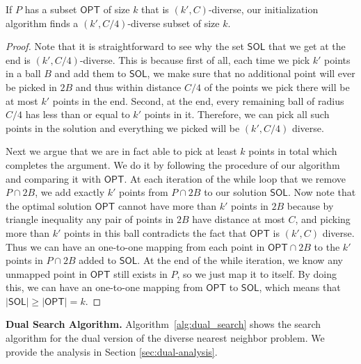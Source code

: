 \begin{lemma}[Initialization]\label{lm:initialization}
If $P$ has a subset $\mathsf{OPT}$ of size $k$ that is $(k',C)$-diverse, our initialization algorithm finds a $(k',C/4)$-diverse subset of size $k$.
\end{lemma}
\begin{proof}
    Note that it is straightforward to see why the set $\mathsf{SOL}$ that we get at the end is $(k',C/4)$-diverse. This is because first of all, each time we pick $k'$ points in a ball $B$ and add them to $\mathsf{SOL}$, we make sure that no additional point will ever be picked in $2B$ and thus within distance $C/4$ of the points we pick there will be at most $k'$ points in the end. Second, at the end, every remaining ball of radius $C/4$ has less than or equal to $k'$ points in it. Therefore, we can pick all such points in the solution and everything we picked will be $(k',C/4)$ diverse.


    Next we argue that we are in fact able to pick at least $k$ points in total which completes the argument. We do it by following the procedure of our algorithm and comparing it with $\mathsf{OPT}$. 
    At each iteration of the while loop that we remove $P\cap 2B$, we add exactly $k'$ points from $P\cap 2B$ to our solution $\mathsf{SOL}$. 
    Now note that the optimal solution $\mathsf{OPT}$ cannot have more than $k'$ points in $2B$ because by triangle inequality any pair of points in $2B$ have distance at most $C$, and picking more than $k'$ points in this ball contradicts the fact that $\mathsf{OPT}$ is $(k',C)$ diverse. Thus we can have an one-to-one mapping from each point in $\mathsf{OPT}\cap 2B$ to the $k'$ points in $P\cap 2B$ added to $\mathsf{SOL}$.
    At the end of the while iteration, we know any unmapped point in $\mathsf{OPT}$ still exists in $P$, so we just map it to itself. By doing this, we can have an one-to-one mapping from $\mathsf{OPT}$ to $\mathsf{SOL}$, which means that $|\mathsf{SOL}|\ge|\mathsf{OPT}|=k$. 
\end{proof}


\noindent\textbf{Dual Search Algorithm.} Algorithm~\ref{alg:dual_search} shows the search algorithm for the dual version of the diverse nearest neighbor problem. We provide the analysis in Section \ref{sec:dual-analysis}.


